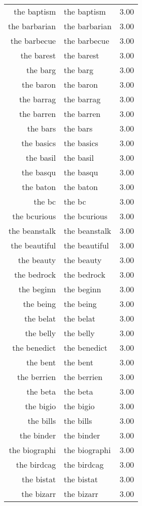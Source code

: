 \begin{table}[ht]
\begin{tabular}{rlr}
  the baptism & the baptism & 3.00 \\ 
  the barbarian & the barbarian & 3.00 \\ 
  the barbecue & the barbecue & 3.00 \\ 
  the barest & the barest & 3.00 \\ 
  the barg & the barg & 3.00 \\ 
  the baron & the baron & 3.00 \\ 
  the barrag & the barrag & 3.00 \\ 
  the barren & the barren & 3.00 \\ 
  the bars & the bars & 3.00 \\ 
  the basics & the basics & 3.00 \\ 
  the basil & the basil & 3.00 \\ 
  the basqu & the basqu & 3.00 \\ 
  the baton & the baton & 3.00 \\ 
  the bc & the bc & 3.00 \\ 
  the bcurious & the bcurious & 3.00 \\ 
  the beanstalk & the beanstalk & 3.00 \\ 
  the beautiful & the beautiful & 3.00 \\ 
  the beauty & the beauty & 3.00 \\ 
  the bedrock & the bedrock & 3.00 \\ 
  the beginn & the beginn & 3.00 \\ 
  the being & the being & 3.00 \\ 
  the belat & the belat & 3.00 \\ 
  the belly & the belly & 3.00 \\ 
  the benedict & the benedict & 3.00 \\ 
  the bent & the bent & 3.00 \\ 
  the berrien & the berrien & 3.00 \\ 
  the beta & the beta & 3.00 \\ 
  the bigio & the bigio & 3.00 \\ 
  the bills & the bills & 3.00 \\ 
  the binder & the binder & 3.00 \\ 
  the biographi & the biographi & 3.00 \\ 
  the birdcag & the birdcag & 3.00 \\ 
  the bistat & the bistat & 3.00 \\ 
  the bizarr & the bizarr & 3.00 \\ 

\end{tabular}
\end{table}
